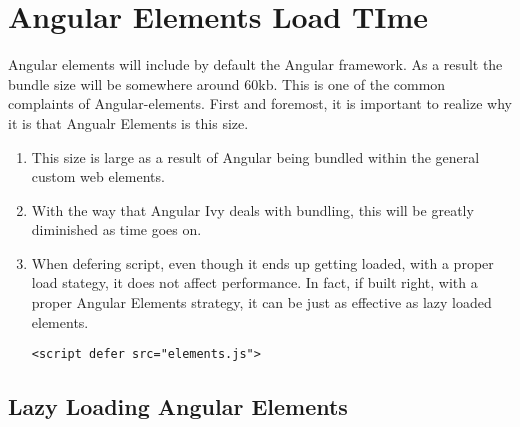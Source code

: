 \chapter{Angular Elements Load TIme}
Angular elements will include by default the Angular framework. As a result the bundle size will be somewhere around 60kb. This is one of the common complaints of Angular-elements. First and foremost, it is important to realize why it is that Angualr Elements is this size. 

\begin{enumerate}
  \item This size is large as a result of Angular being bundled within the general custom web elements.
  \item With the way that Angular Ivy deals with bundling, this will be greatly diminished as time goes on.
  \item When defering script, even though it ends up getting loaded, with a proper load stategy, it does not affect performance. In fact, if built right, with a proper Angular Elements strategy, it can be just as effective as lazy loaded elements.
\begin{verbatim}
<script defer src="elements.js">
\end{verbatim}
\end{enumerate}

\section{Lazy Loading Angular Elements}
